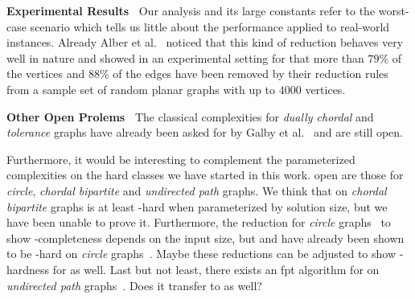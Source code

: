 \noindent \textbf{Experimental Results~}
Our analysis and its large constants refer to the worst-case scenario which tells us little about the performance applied to real-world instances.
Already Alber et al.~\cite{Alber2004} noticed that this kind of reduction behaves very well in nature and showed in an experimental setting for \pdom that more than $79\%$ of the vertices and $88\%$ of the edges have been removed by their reduction rules from a sample set of random planar graphs with up to $4000$ vertices. 

\noindent \textbf{Other Open Prolems~}
The classical complexities for \textit{dually chordal} and \textit{tolerance} graphs have already been asked for by Galby et al.~\cite{Galby2020} and are still open.

Furthermore, it would be interesting to complement the parameterized complexities on the hard classes we have started in this work.
open are those for \textit{circle}, \textit{chordal bipartite} and \textit{undirected path} graphs.
We think that \sdoms on \textit{chordal bipartite} graphs is at least \WONEhs-hard when parameterized by solution size, but we have been unable to prove it.
Furthermore, the reduction for \textit{circle} graphs~\cite{Kloks2021} to show \NP-completeness depends on the input size, but \doms and \tdoms have already been shown to be \WONEhs-hard on \textit{circle} graphs~\cite{Bousquet2012}. 
Maybe these reductions can be adjusted to show \WONEhs-hardness for \sdoms as well.
Last but not least, there exists an fpt algorithm for \doms on \textit{undirected path} graphs~\cite{Figueiredo2022}. 
Does it transfer to \sdoms as well?

